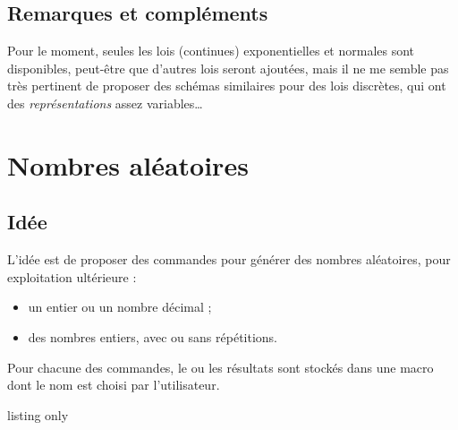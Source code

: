 \subsection{Remarques et compléments}

\begin{noteblock}
Pour le moment, seules les lois (continues) exponentielles et normales sont disponibles, peut-être que d'autres lois seront ajoutées, mais il ne me semble pas très pertinent de proposer des schémas similaires pour des lois discrètes, qui ont des \textit{représentations} assez variables\ldots
\end{noteblock}

\newpage

\section{Nombres aléatoires}\label{entiersaleatoires}

\subsection{Idée}

\begin{tipblock}
 L'idée est de proposer des commandes pour générer des nombres aléatoires, pour exploitation ultérieure :

\begin{itemize}
	\item un entier ou un nombre décimal ;
	\item des nombres entiers, avec ou sans répétitions.
\end{itemize}
\vspace*{-\baselineskip}\leavevmode
\end{tipblock}

\begin{noteblock}
Pour chacune des commandes, le ou les résultats sont stockés dans une \textsf{macro} dont le nom est choisi par l'utilisateur.
\end{noteblock}

\begin{PresCodeTexPL}{listing only}



\end{PresCodeTexPL}

